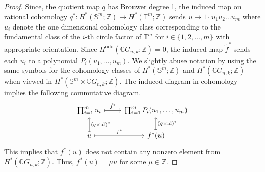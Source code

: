 \documentclass{amsart}
\newtheorem{remark}[theorem]{Remark}
\newcommand{\thmref}[1]{Theorem~\ref{#1}}
\begin{document}
\begin{proof}
		Since, the %
quotient map $q$ has Brouwer degree 1, the induced map on rational cohomology $q^*: H^*(\mathbb{S}^m; \mathbb{Z}) \rightarrow H^*(\mathbb{T}^m;\mathbb{Z})$ %
sends $u\mapsto 1\cdot u_1 u_2 \dots u_m$ where %
$u_i$ denote the one dimensional cohomology class corresponding to the fundamental class of the $i$-th circle factor of $\mathbb T^m$ for $i\in \{1,2,\ldots,m\}$ with appropriate orientation. 
		Since $H^{\mathrm{odd}}(\mathbb{C}G_{n,k};\mathbb Z)=0$, the induced map $\tilde f^*$ sends each $u_i$ to a polynomial $P_i(u_1,\dots,u_m)$.  We slightly abuse notation by using the same symbols for the cohomology classes of $H^*(\mathbb S^m;\mathbb Z)$ and $H^*(\mathbb{C}G_{n,k};\mathbb Z)$ when viewed in $H^*(\mathbb S^m\times \mathbb CG_{n,k};\mathbb Z)$.
		The induced diagram in cohomology implies the following %
commutative diagram.
		\[
		\begin{tikzcd}
			{\prod_{i=1}^m u_i} & {\prod_{i=1}^m P_i(u_1,\ldots,u_m)} \\
			u & {f^*(u)}
			\arrow["{\tilde f^*}", maps to, from=1-1, to=1-2]
			\arrow["{(q\times \mathrm{id})^*}"', maps to, from=2-1, to=1-1]
			\arrow["{f^*}", maps to, from=2-1, to=2-2]
			\arrow["{(q\times \mathrm{id})^*}"', maps to, from=2-2, to=1-2]
		\end{tikzcd}
		\]
		This %
implies that $f^*(u)$ does not contain any nonzero element from $H^*(\mathbb{C}G_{n,k};\mathbb Z)$.  
		Thus, $f^*(u)=\mu u$ for some $\mu\in \mathbb Z$.
	\end{proof}
	
	
	
	
	
	
	
	
	
\end{document}
